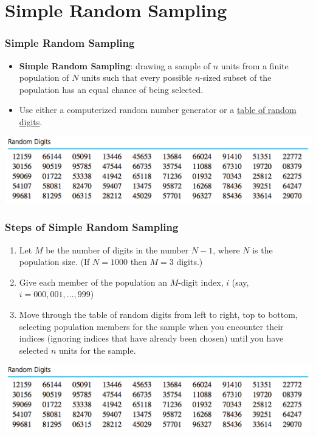 \documentclass[handout]{beamer}\usepackage{graphicx, color}
\numberwithin{equation}{section}
\begin{document}
\section{Simple Random Sampling}


\begin{frame}
\frametitle{Simple Random Sampling}
\begin{itemize}
\item {\bf Simple Random Sampling}: drawing a sample of $n$ units from a finite population of $N$ units such that every possible $n$-sized subset of the population has an equal chance of being selected.
\pause \item Use either a computerized random number generator or a \href{http://will-landau.com/stat305/tables/random-digits.pdf}{table of random digits}.
\end{itemize}

\begin{center}
 \includegraphics{../../fig/rdigits.png}
\end{center}

\end{frame}


\begin{frame}
\frametitle{Steps of Simple Random Sampling} \small

\begin{enumerate}[1. ]
\item Let $M$ be the number of digits in the number $N -1$, where $N$ is the population size. (If $N = 1000$ then $M = 3$ digits.)
\pause \item Give each member of the population an $M$-digit index, $i$ (say, $i = 000, 001, \ldots, 999$)
\pause \item Move through the table of random digits from left to right, top to bottom, selecting population members for the sample when you encounter their indices (ignoring indices that have already been chosen) until you have selected $n$ units for the sample.
\end{enumerate}

\begin{center}
 \includegraphics{../../fig/rdigits.png}
\end{center}
\end{frame}
\end{document}
